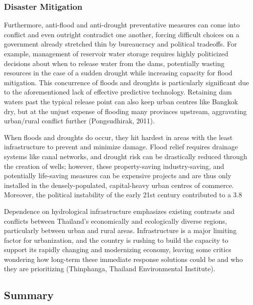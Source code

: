 \subsubsection{Disaster Mitigation}

Furthermore, anti-flood and anti-drought preventative measures can come into conflict and even outright contradict one another, forcing difficult choices on a government already stretched thin by bureaucracy and political tradeoffs. For example, management of reservoir water storage requires highly politicized decisions about when to release water from the dams, potentially wasting resources in the case of a sudden drought while increasing capacity for flood mitigation. This concurrence of floods and droughts is particularly significant due to the aforementioned lack of effective predictive technology. Retaining dam waters past the typical release point can also keep urban centres like Bangkok dry, but at the unjust expense of flooding many provinces upstream, aggravating urban/rural conflict further (Pongsudhirak, 2011). 

When floods and droughts do occur, they hit hardest in areas with the least infrastructure to prevent and minimize damage. Flood relief requires drainage systems like canal networks, and drought risk can be drastically reduced through the creation of wells; however, these property-saving industry-saving, and potentially life-saving measures can be expensive projects and are thus only installed in the densely-populated, capital-heavy urban centres of commerce. Moreover, the political instability of the early 21st century contributed to a 3.8%

Dependence on hydrological infrastructure emphasizes existing contrasts and conflicts between Thailand’s economically and ecologically diverse regions, particularly between urban and rural areas. Infrastructure is a major limiting factor for urbanization, and the country is rushing to build the capacity to support its rapidly changing and modernizing economy, leaving some critics wondering how long-term these immediate response solutions could be and who they are prioritizing (Thinphanga, Thailand Environmental Institute). 

\subsection{Summary}

